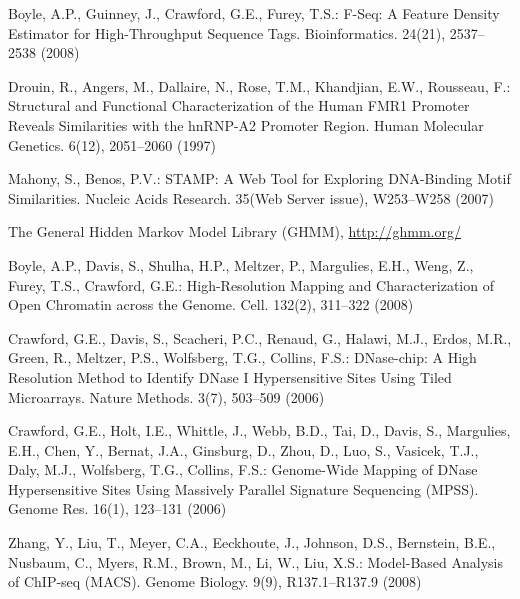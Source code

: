 \documentclass[runningheads,a4paper]{llncs}
\begin{document}
\begin{thebibliography}{4}
 Boyle, A.P., Guinney, J., Crawford, G.E., Furey, T.S.: F-Seq: A Feature Density Estimator for High-Throughput Sequence Tags. Bioinformatics. 24(21), 2537--2538 (2008)

 Drouin, R., Angers, M., Dallaire, N., Rose, T.M., Khandjian, E.W., Rousseau, F.: Structural and Functional Characterization of the Human FMR1 Promoter Reveals Similarities with the hnRNP-A2 Promoter Region. Human Molecular Genetics. 6(12), 2051--2060 (1997)

 Mahony, S., Benos, P.V.: STAMP: A Web Tool for Exploring DNA-Binding Motif Similarities. Nucleic Acids Research. 35(Web Server issue), W253--W258 (2007)

 The General Hidden Markov Model Library (GHMM), \url{http://ghmm.org/}

 Boyle, A.P., Davis, S., Shulha, H.P., Meltzer, P., Margulies, E.H., Weng, Z., Furey, T.S., 
Crawford, G.E.: High-Resolution Mapping and Characterization of Open Chromatin across the Genome. 
Cell. 132(2), 311--322 (2008)

 Crawford, G.E., Davis, S., Scacheri, P.C., Renaud, G., Halawi, M.J., Erdos, M.R., Green, R.,
Meltzer, P.S., Wolfsberg, T.G., Collins, F.S.: DNase-chip: A High Resolution Method to Identify DNase I Hypersensitive Sites Using Tiled Microarrays. Nature Methods. 3(7), 503--509 (2006)

 Crawford, G.E., Holt, I.E., Whittle, J., Webb, B.D., Tai, D., Davis, S., Margulies, E.H., Chen, Y., Bernat, J.A., Ginsburg, D., Zhou, D., Luo, S., Vasicek, T.J., Daly, M.J., Wolfsberg, T.G., Collins, F.S.: Genome-Wide Mapping of DNase Hypersensitive Sites Using Massively Parallel Signature Sequencing (MPSS). Genome Res. 16(1), 123--131 (2006)

 Zhang, Y., Liu, T., Meyer, C.A., Eeckhoute, J., Johnson, D.S., Bernstein, B.E., Nusbaum, C., Myers, R.M., Brown, M., Li, W., Liu, X.S.: Model-Based Analysis of ChIP-seq (MACS). Genome Biology. 9(9), R137.1--R137.9 (2008)

\end{thebibliography}
\end{document}
